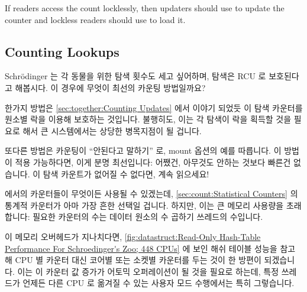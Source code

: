 If readers access the count locklessly, then updaters should use
 to update the counter and lockless readers should
use  to load it.

\fi

\subsection{Counting Lookups}
\label{sec:together:Counting Lookups}

Schr\"odinger 는 각 동물을 위한 탐색 횟수도 세고 싶어하며, 탐색은 RCU 로
보호된다고 해봅시다.
이 경우에 무엇이 최선의 카운팅 방법일까요?

한가지 방법은
\cref{sec:together:Counting Updates} 에서 이야기 되었듯 이 탐색 카운터를 원소별
락을 이용해 보호하는 것입니다.
불행히도, 이는 각 탐색이 락을 획득할 것을 필요로 해서 큰 시스템에서는 상당한
병목지점이 될 겁니다.

또다른 방법은 카운팅이 ``안된다고 말하기'' 로,  mount 옵션의 예를
따릅니다.
이 방법이 적용 가능하다면, 이게 분명 최선입니다:  어쨌건, 아무것도 안하는
것보다 빠른건 없습니다.
이 탐색 카운트가 없어질 수 없다면, 계속 읽으세요!

\iffalse

Suppose that Schr\"odinger also wants to count the number of lookups for
each animal, where lookups are protected by RCU\@.
How can this counting best be done?

One approach would be to protect a lookup counter with the per-element
lock, as discussed in \cref{sec:together:Counting Updates}.
Unfortunately, this would require all lookups to acquire this lock,
which would be a severe bottleneck on large systems.

Another approach is to ``just say no'' to counting, following the example
of the \co{noatime} mount option.
If this approach is feasible, it is clearly the best:  After all, nothing
is faster than doing nothing.
If the lookup count cannot be dispensed with, read on!

\fi

 에서의 카운터들이 무엇이든 사용될 수 있겠는데,
\cref{sec:count:Statistical Counters} 의 통계적 카운터가 아마 가장 흔한 선택일
겁니다.
하지만, 이는 큰 메모리 사용량을 초래합니다: 필요한 카운터의 수는 데이터 원소의
수 곱하기 쓰레드의 수입니다.

이 메모리 오버헤드가 지나치다면,
\cref{fig:datastruct:Read-Only Hash-Table Performance For Schroedinger's Zoo; 448 CPUs}
에 보인 해쉬 테이블 성능을 참고해 CPU 별 카운터 대신 코어별 또는 소켓별
카운터를 두는 것이 한 방편이 되겠습니다.
이는 이 카운터 값 증가가 어토믹 오퍼레이션이 될 것을 필요로 하는데, 특정
쓰레드가 언제든 다른 CPU 로 옮겨질 수 있는 사용자 모드 수행에서는 특히
그렇습니다.

